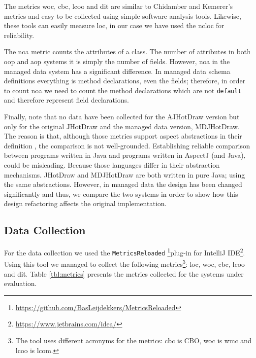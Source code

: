 The metrics \ac{woc}, \ac{cbc}, \ac{lcoo} and \ac{dit} are similar to Chidamber and Kemerer's metrics and easy to be collected using simple software analysis tools.
Likewise, these tools can easily measure \ac{loc}, in our case we have used the \ac{ncloc} for reliability.

The \ac{noa} metric counts the attributes of a class.
The number of attributes in both \ac{oop} and \ac{aop} systems it is simply the number of fields.
However, \ac{noa} in the managed data system has a significant difference.
In managed data schema definitions everything is method declarations, even the fields; therefore, in order to count \ac{noa} we need to count the method declarations which are not \texttt{default} and therefore represent field declarations.

Finally, note that no data have been collected for the AJHotDraw version but only for the original JHotDraw and the managed data version, MDJHotDraw.
The reason is that, although those metrics support aspect abstractions in their definition \cite{sant2003reuse}, the comparison is not well-grounded.
Establishing reliable comparison between programs written in Java and programs written in AspectJ (and Java), could be misleading.
Because those languages differ in their abstraction mechanisms.
JHotDraw and MDJHotDraw are both written in pure Java; using the same abstractions.
However, in managed data the design has been changed significantly and thus, we compare the two systems in order to show how this design refactoring affects the original implementation.

\subsection{Data Collection}
For the data collection we used the \texttt{MetricsReloaded} \footnote{
	\url{https://github.com/BasLeijdekkers/MetricsReloaded}}plug-in for IntelliJ IDE\footnote{\url{https://www.jetbrains.com/idea/}}.
Using this tool we managed to collect the following metrics\footnote{
	The tool uses different acronyms \cite{chidamber1994metrics} for the metrics: \ac{cbc} is CBO, \ac{woc} is \ac{wmc} and \ac{lcoo} is \ac{lcom}.
}: \ac{loc}, \ac{woc}, \ac{cbc}, \ac{lcoo} and \ac{dit}.
Table \ref{tbl:metrics} presents the metrics collected for the systems under evaluation.

